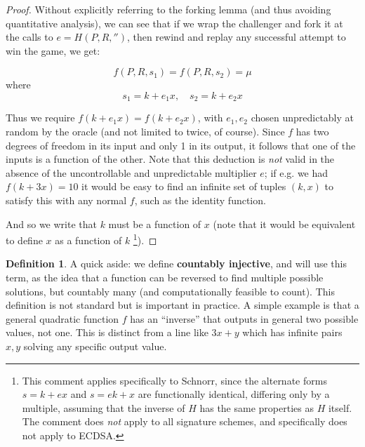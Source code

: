 \documentclass[10pt,a4paper]{article}
\newtheorem{lemma}{Lemma}       %
\theoremstyle{definition}   %
\newtheorem{definition}{Definition}
\theoremstyle{remark}       %
\begin{document}
\begin{proof}
Without explicitly referring to the forking lemma (and thus avoiding quantitative analysis), we can see that if we wrap the challenger and fork it at the calls to $e = H(P, R, '')$, then rewind and replay any successful attempt to win the game, we get:

\[f(P, R, s_1) = f(P, R, s_2) = \mu \]
where
\[s_1 = k + e_1 x, \quad s_2 = k + e_2 x \]

Thus we require $f(k + e_1 x) = f(k + e_2 x)$, with $e_1, e_2$ chosen unpredictably at random by the oracle (and not limited to twice, of course). Since $f$ has two degrees of freedom in its input and only 1 in its output, it follows that one of the inputs is a function of the other. Note that this deduction is \emph{not} valid in the absence of the uncontrollable and unpredictable multiplier $e$; if e.g. we had $f(k + 3x) = 10$ it would be easy to find an infinite set of tuples $(k, x)$ to satisfy this with any normal $f$, such as the identity function.

And so we write that $k$ must be a function of $x$  (note that it would be equivalent to define $x$ as a function of $k$ \footnote{This comment applies specifically to Schnorr, since the alternate forms $s = k + ex$ and $s = ek + x$ are functionally identical, differing only by a multiple, assuming that the inverse of $H$ has the same properties as $H$ itself. The comment does \emph{not} apply to all signature schemes, and specifically does not apply to ECDSA.}).
\end{proof}

\iffalse
\begin{lemma}[Composite invertibility]
\label{lem:compinver}
Let \( g : A \to B \) and \( h : B \to C \) be functions, and define \( f = h \circ g : A \to C \).
If \( f \) and \( g \) are invertible, then \( h \) is also invertible, with
\[
    h^{-1} = g \circ f^{-1}.
\]
\end{lemma}

\begin{proof}
Since \( f = h \circ g \), we have \( h = f \circ g^{-1} \).
Because both \( f \) and \( g^{-1} \) are bijective, their composition \( h \) is bijective as well.
Thus \( h \) is invertible, and its inverse is given by \( h^{-1} = g \circ f^{-1} \).
\end{proof}
\fi

\begin{definition}
A quick aside: we define \textbf{countably injective}, and will use this term, as the idea that a function can be reversed to find multiple possible solutions, but countably many (and computationally feasible to count). This definition is not standard but is important in practice. A simple example is that a general quadratic function $f$ has an ``inverse'' that outputs in general two possible values, not one. This is distinct from a line like $3x+y$ which has infinite pairs $x, y$ solving any specific output value.
\end{definition}
\end{document}
